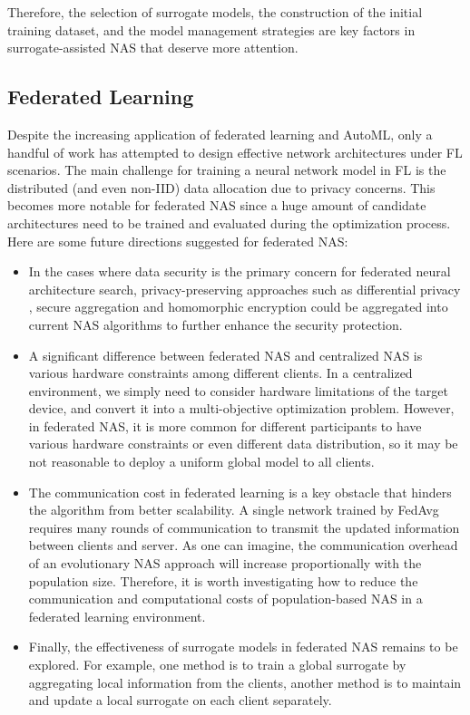 \documentclass[journal]{IEEEtran}
\begin{document}
Therefore, the selection of surrogate models, the construction of the initial training dataset, and the model management strategies are key factors in surrogate-assisted NAS that deserve more attention.


\subsection{Federated Learning}

Despite the increasing application of federated learning and AutoML, only a handful of work has attempted to design effective network architectures under FL scenarios. The main challenge for training a neural network model in FL is the distributed (and even non-IID) data allocation due to privacy concerns. This becomes more notable for federated NAS since a huge amount of candidate architectures need to be trained and evaluated during the optimization process. Here are some future directions suggested for federated NAS:

\begin{itemize}

\item In the cases where data security is the primary concern for federated neural architecture search, privacy-preserving approaches such as differential privacy \cite{dwork2014algorithmic}, secure aggregation \cite{bonawitz2016practical} and homomorphic encryption \cite{acar2018survey} could be aggregated into current NAS algorithms to further enhance the security protection.

\item A significant difference between federated NAS and centralized NAS is various hardware constraints among different clients. In a centralized environment, we simply need to consider hardware limitations of the target device, and convert it into a multi-objective optimization problem. However, in federated NAS, it is more common for different participants to have various hardware constraints or even different data distribution, so it may be not reasonable to deploy a uniform global model to all clients.

\item The communication cost in federated learning is a key obstacle that hinders the algorithm from better scalability. A single network trained by FedAvg \cite{mcmahan2017communication} requires many rounds of communication to transmit the updated information between clients and server. As one can imagine, the communication overhead of an evolutionary NAS approach will increase proportionally with the population size. Therefore, it is worth investigating how to reduce the communication and computational costs of population-based NAS in a federated learning environment.

\item Finally, the effectiveness of surrogate models in federated NAS remains to be explored. For example, one method is to train a global surrogate by aggregating local information from the clients, another method is to maintain and update a local surrogate on each client separately.

\end{itemize}
\end{document}
